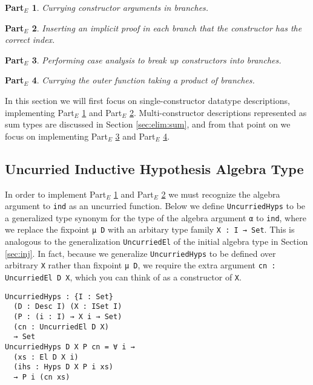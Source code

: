 \documentclass[preprint,nonatbib]{sigplanconf}
\newtheorem{myparte}{Part$_E$}
\newcommand{\refsec}[1]{Section \ref{sec:#1}}
\newcommand{\refparte}[1]{Part$_E$ \ref{parte:#1}}
\begin{document}
\begin{myparte}
\label{parte:one}
Currying constructor arguments in branches.
\end{myparte}

\begin{myparte}
\label{parte:two}
Inserting an implicit proof in each branch that the constructor has the correct index.
\end{myparte}

\begin{myparte}
\label{parte:three}
Performing case analysis to break up constructors into branches.
\end{myparte}

\begin{myparte}
\label{parte:four}
Currying the outer function taking a product of branches.
\end{myparte}

In this section we will first focus on single-constructor
datatype descriptions, implementing \refparte{one} and \refparte{two}.
Multi-constructor descriptions represented as sum types are
discussed in \refsec{elim:sum}, and from that point on we focus on
implementing \refparte{three} and \refparte{four}.

\subsection{Uncurried Inductive Hypothesis Algebra Type}

In order to implement
\refparte{one} and \refparte{two} we must recognize the algebra
argument to {\tt ind} as an uncurried function.
Below we define {\tt UncurriedHyps} to be a generalized type synonym
for the type of the algebra argument {\tt α} to {\tt ind}, where we
replace the fixpoint
{\tt μ D} with an arbitary type family {\tt X : I → Set}. This is
analogous to the generalization {\tt UncurriedEl} of the initial
algebra type in \refsec{inj}. In fact, because we generalize
{\tt UncurriedHyps} to be defined over arbitrary {\tt X} rather than
fixpoint {\tt μ D}, we require the extra argument
{\tt cn : UncurriedEl D X}, which you can think of as a
constructor of {\tt X}.

\begin{verbatim}
UncurriedHyps : {I : Set}
  (D : Desc I) (X : ISet I)
  (P : (i : I) → X i → Set)
  (cn : UncurriedEl D X)
  → Set
UncurriedHyps D X P cn = ∀ i →
  (xs : El D X i)
  (ihs : Hyps D X P i xs)
  → P i (cn xs)
\end{verbatim}
\end{document}
